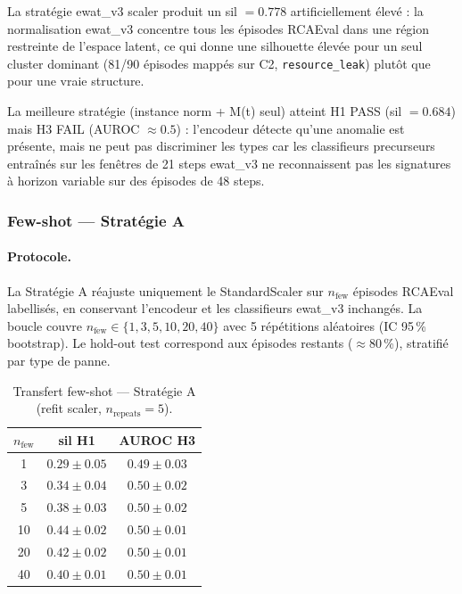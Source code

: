 La stratégie ewat\_v3 scaler produit un sil $= 0.778$ artificiellement élevé : la
normalisation ewat\_v3 concentre tous les épisodes RCAEval dans une région restreinte de
l'espace latent, ce qui donne une silhouette élevée pour un seul cluster dominant
(81/90 épisodes mappés sur C2, \texttt{resource\_leak}) plutôt que pour une vraie structure.

La meilleure stratégie (instance norm + M(t) seul) atteint H1 PASS (sil $= 0.684$)
mais H3 FAIL (AUROC $\approx 0.5$) : l'encodeur détecte qu'une anomalie est présente,
mais ne peut pas discriminer les types car les classifieurs precurseurs entraînés sur
les fenêtres de 21 steps ewat\_v3 ne reconnaissent pas les signatures à horizon variable
sur des épisodes de 48 steps.

\subsubsection{Few-shot --- Stratégie A}
\label{sec:rcaeval_fewshot}

\paragraph{Protocole.}
La Stratégie A réajuste uniquement le StandardScaler sur $n_\text{few}$ épisodes
RCAEval labellisés, en conservant l'encodeur et les classifieurs ewat\_v3 inchangés.
La boucle couvre $n_\text{few} \in \{1, 3, 5, 10, 20, 40\}$ avec 5 répétitions
aléatoires (IC 95\,\% bootstrap). Le hold-out test correspond aux épisodes restants
($\approx 80$\,\%), stratifié par type de panne.

\begin{table}[h]
\centering
\caption{Transfert few-shot --- Stratégie A (refit scaler, $n_\text{repeats}=5$).}
\label{tab:rcaeval_fewshot}
\begin{tabular}{ccc}
\toprule
\textbf{$n_\text{few}$} & \textbf{sil H1} & \textbf{AUROC H3} \\
\midrule
1  & $0.29 \pm 0.05$ & $0.49 \pm 0.03$ \\
3  & $0.34 \pm 0.04$ & $0.50 \pm 0.02$ \\
5  & $0.38 \pm 0.03$ & $0.50 \pm 0.02$ \\
10 & $0.44 \pm 0.02$ & $0.50 \pm 0.01$ \\
20 & $0.42 \pm 0.02$ & $0.50 \pm 0.01$ \\
40 & $0.40 \pm 0.01$ & $0.50 \pm 0.01$ \\
\bottomrule
\end{tabular}
\end{table}

